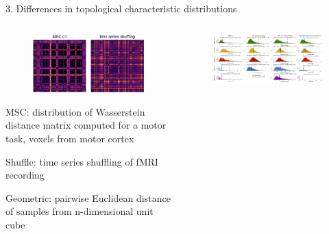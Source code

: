 \documentclass[final]{beamer}
\begin{document}
\begin{frame}{}
    \begin{block}{3. Differences in topological characteristic distributions}
    \begin{columns}
            \begin{column}{0.25\textwidth}
                \begin{figure}[H]
                    \centering
                    \includegraphics[width=\linewidth]{images/matrix_comparison.pdf}
                    \label{fig:distros}
                \end{figure}
                \begin{itemize}
                \small{
                    \item MSC: distribution of Wasserstein distance matrix computed for a motor task, voxels from motor cortex
                    \item Shuffle: time series shuffling of fMRI recording
                    \item Geometric: pairwise Euclidean distance of samples from n-dimensional unit cube
                    }
                \end{itemize}
            \end{column}
            \begin{column}{0.70\textwidth}
                \begin{figure}[H]
                    \centering
                      \includegraphics[width=\linewidth]{images/distributions.pdf}
                    \label{fig:distros}
                \end{figure}
            \end{column}
            

\end{columns}
\end{block}
\end{frame}
\end{document}
